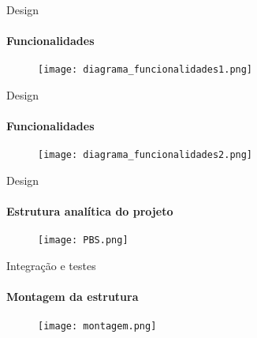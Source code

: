 \begin{frame}[t]{Design}
    \framesubtitle{Funcionalidades}
    \begin{figure}
        \texttt{[image: diagrama\_funcionalidades1.png]}
    \end{figure}
\end{frame}
\begin{frame}[t]{Design}
    \framesubtitle{Funcionalidades}
    \begin{figure}
        \texttt{[image: diagrama\_funcionalidades2.png]}
    \end{figure}
\end{frame}

\begin{frame}[t]{Design}
    \framesubtitle{Estrutura analítica do projeto}
    \begin{figure}
        \texttt{[image: PBS.png]}
    \end{figure}
\end{frame}

\begin{frame}[t]{Integração e testes}
    \framesubtitle{Montagem da estrutura}
    \vspace*{0.9cm}
    \begin{figure}
        \texttt{[image: montagem.png]}
    \end{figure}
\end{frame}


